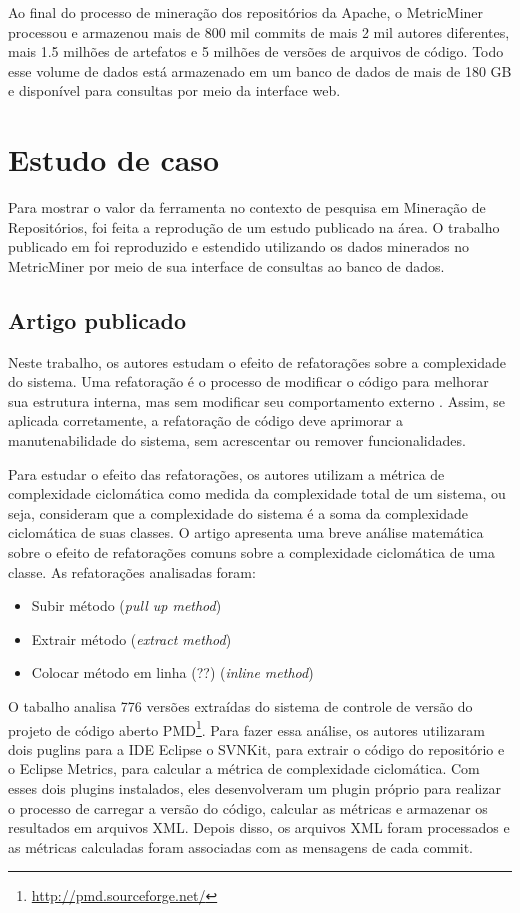 \documentclass[a4paper, 12pt, twoside]{book}
\begin{document}
        Ao final do processo de mineração dos repositórios da Apache, o MetricMiner processou e armazenou mais de 800 mil commits de mais 2 mil autores diferentes, mais 1.5 milhões de artefatos e 5 milhões de versões de arquivos de código. Todo esse volume de dados está armazenado em um banco de dados de mais de 180 GB e disponível para consultas por meio da interface web.

    \section{Estudo de caso} \label{sc:estudo-caso}
        Para mostrar o valor da ferramenta no contexto de pesquisa em Mineração de Repositórios, foi feita a reprodução de um estudo publicado na área. O trabalho publicado em \cite{SoetensQUATIC2010} foi reproduzido e estendido utilizando os dados minerados no MetricMiner por meio de sua interface de consultas ao banco de dados.

        \subsection*{Artigo publicado}

        Neste trabalho, os autores estudam o efeito de refatorações sobre a complexidade do sistema. Uma refatoração é o processo de modificar o código para melhorar sua estrutura interna, mas sem modificar seu comportamento externo \cite{fowler-refactoring}. Assim, se aplicada corretamente, a refatoração de código deve aprimorar a manutenabilidade do sistema, sem acrescentar ou remover funcionalidades.

        Para estudar o efeito das refatorações, os autores utilizam a métrica de complexidade ciclomática como medida da complexidade total de um sistema, ou seja, consideram que a complexidade do sistema é a soma da complexidade ciclomática de suas classes. O artigo apresenta uma breve análise matemática sobre o efeito de refatorações comuns sobre a complexidade ciclomática de uma classe. As refatorações analisadas foram: 
        \begin{itemize}
            \item Subir método (\textit{pull up method})
            \item Extrair método (\textit{extract method})
            \item Colocar método em linha (??) (\textit{inline method})
        \end{itemize}

        O tabalho analisa 776 versões extraídas do sistema de controle de versão do projeto de código aberto PMD\footnote{\url{http://pmd.sourceforge.net/}}. Para fazer essa análise, os autores utilizaram dois puglins para a IDE Eclipse o SVNKit, para extrair o código do repositório e o Eclipse Metrics, para calcular a métrica de complexidade ciclomática. Com esses dois plugins instalados, eles desenvolveram um plugin próprio para realizar o processo de carregar a versão do código, calcular as métricas e armazenar os resultados em arquivos XML. Depois disso, os arquivos XML foram processados e as métricas calculadas foram associadas com as mensagens de cada commit.
\end{document}
